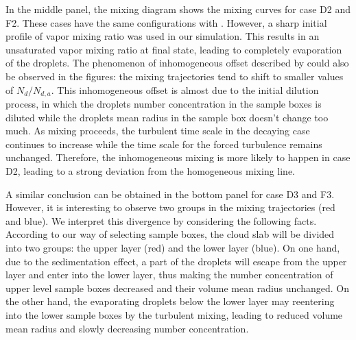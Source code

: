 \documentclass[draft,jgrga]{AGUTeX}
\begin{document}
\begin{article}
In the middle panel, the mixing diagram shows the mixing curves for case D2 and F2. These cases have the same configurations with \cite{Kumar14}. However, a sharp initial profile of vapor mixing ratio was used in our simulation. This results in an unsaturated vapor mixing ratio at final state, leading to completely evaporation of the droplets. The phenomenon of inhomogeneous offset described by \cite{Kumar14} could also be observed in the figures: the mixing trajectories tend to shift to smaller values of $N_d/N_{d,a}$. This inhomogeneous offset is almost due to the initial dilution process, in which the droplets number concentration in the sample boxes is diluted while the droplets mean radius in the sample box doesn't change too much. As mixing proceeds, the turbulent time scale in the decaying case continues to increase while the time scale for the forced turbulence remains unchanged. Therefore, the inhomogeneous mixing is more likely to happen in case D2, leading to a strong deviation from the homogeneous mixing line.

A similar conclusion can be obtained in the bottom panel for case D3 and F3. However, it is interesting to observe two groups in the mixing trajectories (red and blue). We interpret this divergence by considering the following facts. According to our way of selecting sample boxes, the cloud slab will be divided into two groups: the upper layer (red) and the lower layer (blue). On one hand, due to the sedimentation effect, a part of the droplets will escape from the upper layer and enter into the lower layer, thus making the number concentration of upper level sample boxes decreased and their volume mean radius unchanged. On the other hand, the evaporating droplets below the lower layer may reentering into the lower sample boxes by the turbulent mixing, leading to reduced volume mean radius and slowly decreasing number concentration.


\end{article}
\end{document}
